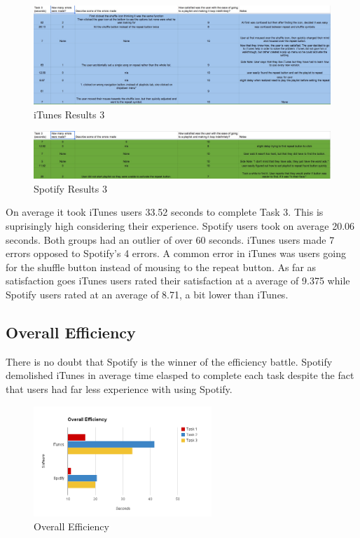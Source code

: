 \documentclass[a4paper]{article}
\begin{document}
\begin{itemize}
          \begin{figure}[H]
              \centering       
              \includegraphics[width=1\textwidth]{itunestask3_copy.jpg}
              \caption{\label{tasks: task3itunes}iTunes Results 3}
          \end{figure}
          \begin{figure}[H]         
              \centering
              \includegraphics[width=1\textwidth]{spotifytask3_copy.jpg}
              \caption{\label{tasks: task3spotify}Spotify Results 3}
          \end{figure}
          
          On average it took iTunes users 33.52 seconds to complete Task 3. This is suprisingly high considering their experience. Spotify users took on average 20.06 seconds. Both groups had an outlier of over 60 seconds. iTunes users made 7 errors opposed to Spotify's 4 errors. A common error in iTunes was users going for the shuffle button instead of mousing to the repeat button. As far as satisfaction goes iTunes users  rated their satisfaction at a average of 9.375 while Spotify users rated at an average of 8.71, a bit lower than iTunes.
      
  \end{itemize}
  
\subsection{Overall Efficiency}
There is no doubt that Spotify is the winner of the efficiency battle. Spotify demolished iTunes in average time elasped to complete each task despite the fact that users had far less experience with using Spotify.
\begin{figure}[H]
\centering
\includegraphics[width=0.6\textwidth]{efficiencyoverall.png}
\caption{\label{overall: efficiency} Overall Efficiency}
\end{figure}
\end{document}
